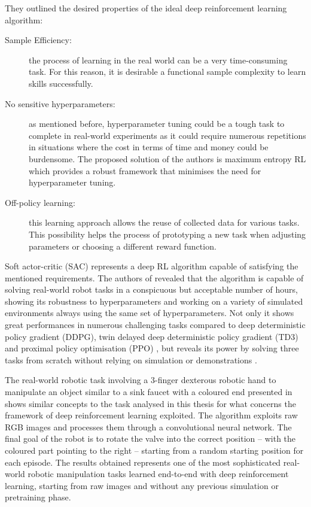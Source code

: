 They outlined the desired properties of the ideal deep reinforcement learning algorithm:
\begin{description}
	\item[Sample Efficiency:] the process of learning in the real world can be a very time-consuming task. For this reason, it is desirable a functional sample complexity to learn skills successfully. 
	\item[No sensitive hyperparameters:] as mentioned before, hyperparameter tuning could be a tough task to complete in real-world experiments as it could require numerous repetitions in situations where the cost in terms of time and money could be burdensome. The proposed solution of the authors is maximum entropy RL which provides a robust framework that minimises the need for hyperparameter tuning.
	\item[Off-policy learning:] this learning approach allows the reuse of collected data for various tasks. This possibility helps the process of prototyping a new task when adjusting parameters or choosing a different reward function.
\end{description}

Soft actor-critic (SAC) represents a deep RL algorithm capable of satisfying the mentioned requirements. The authors of \cite{haarnoja2018soft,haarnoja2018alg} revealed that the algorithm is capable of solving real-world robot tasks in a conspicuous but acceptable number of hours, showing its robustness to hyperparameters and working on a variety of simulated environments always using the same set of hyperparameters.
Not only it shows great performances in numerous challenging tasks compared to deep deterministic policy gradient (DDPG), twin delayed deep deterministic policy gradient (TD3) \cite{fujimoto2018addressing} and proximal policy optimisation (PPO) \cite{schulman2017proximal}, but reveals its power by solving three tasks from scratch without relying on simulation or demonstrations \cite{bair2019soft}.

The real-world robotic task involving a 3-finger dexterous robotic hand to manipulate an object similar to a sink faucet with a coloured end presented in \cite[Section 7.3]{haarnoja2018alg} shows similar concepts to the task analysed in this thesis for what concerns the framework of deep reinforcement learning exploited. The algorithm exploits raw RGB images and processes them through a convolutional neural network. The final goal of the robot is to rotate the valve into the correct position -- with the coloured part pointing to the right -- starting from a random starting position for each episode. The results obtained represents one of the most sophisticated real-world robotic manipulation tasks learned end-to-end with deep reinforcement learning, starting from raw images and without any previous simulation or pretraining phase.


